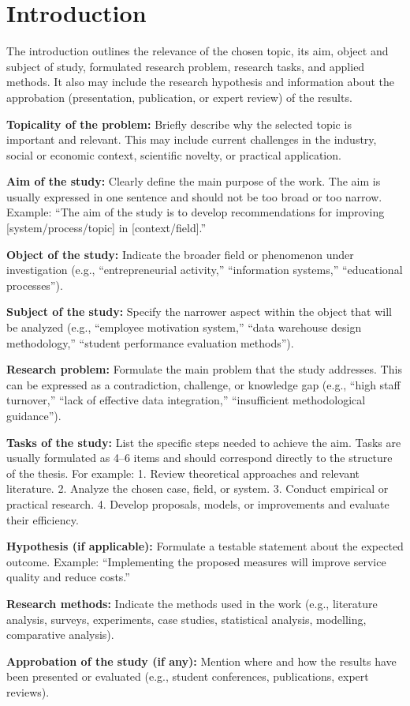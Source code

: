 \chapter{Introduction}

The introduction outlines the relevance of the chosen topic, its aim, object and subject of study, formulated research problem, research tasks, and applied methods. It also may include the research hypothesis and information about the approbation (presentation, publication, or expert review) of the results.  

\textbf{Topicality of the problem:}  
Briefly describe why the selected topic is important and relevant. This may include current challenges in the industry, social or economic context, scientific novelty, or practical application.  

\textbf{Aim of the study:}  
Clearly define the main purpose of the work. The aim is usually expressed in one sentence and should not be too broad or too narrow. Example: “The aim of the study is to develop recommendations for improving [system/process/topic] in [context/field].”  

\textbf{Object of the study:}  
Indicate the broader field or phenomenon under investigation (e.g., “entrepreneurial activity,” “information systems,” “educational processes”).  

\textbf{Subject of the study:}  
Specify the narrower aspect within the object that will be analyzed (e.g., “employee motivation system,” “data warehouse design methodology,” “student performance evaluation methods”).  

\textbf{Research problem:}  
Formulate the main problem that the study addresses. This can be expressed as a contradiction, challenge, or knowledge gap (e.g., “high staff turnover,” “lack of effective data integration,” “insufficient methodological guidance”).  

\textbf{Tasks of the study:}  
List the specific steps needed to achieve the aim. Tasks are usually formulated as 4–6 items and should correspond directly to the structure of the thesis. For example:  
1. Review theoretical approaches and relevant literature.  
2. Analyze the chosen case, field, or system.  
3. Conduct empirical or practical research.  
4. Develop proposals, models, or improvements and evaluate their efficiency.  

\textbf{Hypothesis (if applicable):}  
Formulate a testable statement about the expected outcome. Example: “Implementing the proposed measures will improve service quality and reduce costs.”  

\textbf{Research methods:}  
Indicate the methods used in the work (e.g., literature analysis, surveys, experiments, case studies, statistical analysis, modelling, comparative analysis).  

\textbf{Approbation of the study (if any):}  
Mention where and how the results have been presented or evaluated (e.g., student conferences, publications, expert reviews).  
